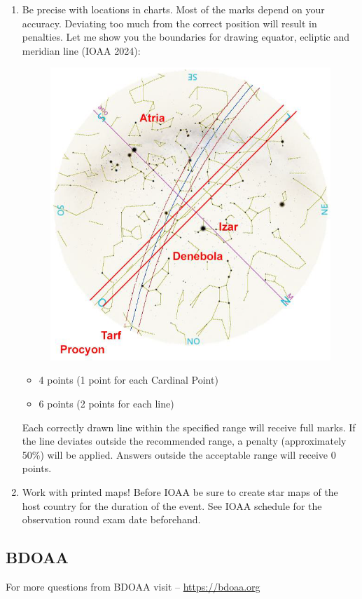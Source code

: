 \documentclass[a4paper,12pt]{extarticle}
\begin{document}
\begin{enumerate}
	\item \textsf{Be precise with locations in charts.} Most of the marks depend on your accuracy. Deviating too much from the correct position will result in penalties. Let me show you the boundaries for drawing equator, ecliptic and meridian line (IOAA 2024):  
\begin{figure}[H]
	\centering
	\includegraphics[width=0.8\linewidth]{boundari_map.png}
\end{figure}
\begin{sol}
\begin{itemize}
	\itemsep0em 
	\item 4 points (1 point for each Cardinal Point)
	\item 6 points (2 points for each line)
\end{itemize}
\end{sol}
{\color{red} Each correctly drawn line within the specified range will receive full marks. If the line deviates outside the recommended range, a penalty (approximately 50\%) will be applied. Answers outside the acceptable range will receive 0 points.} 
\item \textsf{Work with printed maps!} Before IOAA be sure to create star maps of the host country for the duration of the event. See IOAA schedule for the observation round exam date beforehand.
\end{enumerate}



\clearpage
\subsection{BDOAA}
For more questions from BDOAA visit -- \url{https://bdoaa.org}
\end{document}
